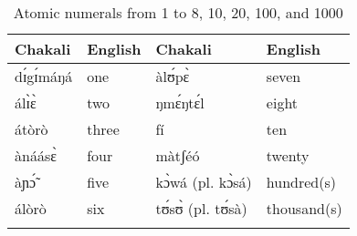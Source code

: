 \begin{exe}
\begin{exe}
\begin{exe}
{\begin{exe}
\begin{exe}
\begin{exe}
\begin{exe}
\begin{exe}
\begin{exe}
\begin{exe}
\begin{xlist}
\begin{exe}
\begin{exe}
\begin{exe}
 \begin{table}[!h]
  \caption{Atomic numerals from 1 to 8, 10, 20, 100, and 1000
\label{tab:numeralatoms}}
   \centering
  \begin{tabular}{llll}
\lsptoprule
Chakali &     English &  Chakali &     English\\ \midrule
 dɪ́gɪ́máŋá & one &   àlʊ́pɛ̀   &seven \\       
álɪ̀ɛ̀ &two   &   ŋmɛ́ŋtɛ́l &eight  \\                 
átòrò &three &   fí &ten \\         
ànáásɛ̀ &four & màtʃéó  &twenty   \\                 
 àɲɔ̃́ &five  &  kɔ̀wá (pl.  kɔ̀sá)   & hundred(s)  \\        
  álòrò   &six &   tʊ́sʊ̀  (pl.  tʊ́sà) &thousand(s)    \\                
 
\lspbottomrule
\end{tabular}
\end{table}


\end{exe}
\end{exe}
\end{exe}
\end{xlist}
\end{exe}
\end{exe}
\end{exe}
\end{exe}
\end{exe}
\end{exe}
\end{exe}}
\end{exe}
\end{exe}
\end{exe}
